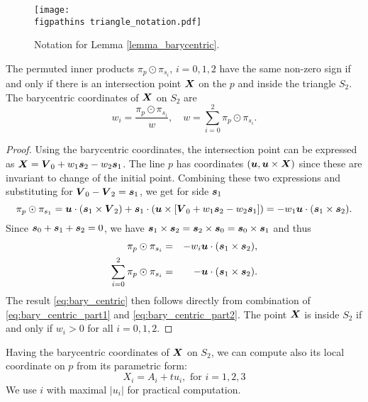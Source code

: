 \begin{figure}[!htb]
    \centering
    \texttt{[image: \\figpathins triangle\_notation.pdf]}
    \caption{Notation for Lemma \ref{lemma_barycentric}.}
    \label{fig:triangle_notation}
\end{figure}

\begin{lemma}
\label{lemma_barycentric}
The permuted inner products $\pi_p \odot \pi_{s_i},\, i=0,1,2$ have the same non-zero sign if and only if there
is an intersection point $\mathbf{\boldsymbol{X}}$ on the $p$ and inside the triangle $S_2$. 
The barycentric coordinates of $\mathbf{\boldsymbol{X}}$ on $S_2$ are
\begin{equation}
  \label{eq:bary_centric}
   w_i = \frac{\pi_p \odot \pi_{s_i}}{w},\quad w=\sum_{i=0}^{2} \pi_p \odot \pi_{s_i}.
\end{equation}
\end{lemma}
\begin{proof}
Using the barycentric coordinates, the intersection point can be expressed as $\mathbf{\boldsymbol{X}} = \mathbf{\boldsymbol{V}}_0 + w_1 \mathbf{\boldsymbol{s}}_2 - w_2 \mathbf{\boldsymbol{s}}_1$.
The line $p$ has \plucker coordinates $(\mathbf{\boldsymbol{u}}, \mathbf{\boldsymbol{u}} \times \mathbf{\boldsymbol{X}})$ since these are invariant to change of the initial point. 
Combining these two expressions and substituting for $\mathbf{\boldsymbol{V}}_0-\mathbf{\boldsymbol{V}}_2=\mathbf{\boldsymbol{s}}_1$, we get for side $\mathbf{\boldsymbol{s}}_1$
\[
   \pi_p \odot \pi_{s_1} = \mathbf{\boldsymbol{u}} \cdot (\mathbf{\boldsymbol{s}}_1 \times \mathbf{\boldsymbol{V}}_2) + \mathbf{\boldsymbol{s}}_1 \cdot ( \mathbf{\boldsymbol{u}} \times [\mathbf{\boldsymbol{V}}_0 + w_1\mathbf{\boldsymbol{s}}_2 - w_2 \mathbf{\boldsymbol{s}}_1])
   =-w_1 \mathbf{\boldsymbol{u}} \cdot (\mathbf{\boldsymbol{s}}_1 \times \mathbf{\boldsymbol{s}}_2).
\]
Since $\mathbf{\boldsymbol{s}}_0 + \mathbf{\boldsymbol{s}}_1 + \mathbf{\boldsymbol{s}}_2=0$, we have $ \mathbf{\boldsymbol{s}}_1 \times \mathbf{\boldsymbol{s}}_2 = \mathbf{\boldsymbol{s}}_2 \times \mathbf{\boldsymbol{s}}_0 = \mathbf{\boldsymbol{s}}_0 \times \mathbf{\boldsymbol{s}}_1$ and thus
\begin{eqnarray}
   \pi_p \odot \pi_{s_i} &=& -w_i \mathbf{\boldsymbol{u}} \cdot (\mathbf{\boldsymbol{s}}_1 \times \mathbf{\boldsymbol{s}}_2), \label{eq:bary_centric_part1}\\
   \sum_{i=0}^{2} \pi_p \odot \pi_{s_i} &=& - \mathbf{\boldsymbol{u}} \cdot (\mathbf{\boldsymbol{s}}_1 \times \mathbf{\boldsymbol{s}}_2). \label{eq:bary_centric_part2}
\end{eqnarray}
The result \eqref{eq:bary_centric} then follows directly from combination of \eqref{eq:bary_centric_part1} and \eqref{eq:bary_centric_part2}.
The point $\mathbf{\boldsymbol{X}}$ is inside $S_2$ if and only if $w_i>0$ for all $i=0,1,2$.
\end{proof}
Having the barycentric coordinates of $\mathbf{\boldsymbol{X}}$ on $S_2$, we can compute also its local coordinate on $p$ from its parametric form:
\begin{equation}
   \label{eq:line}
   X_i  = A_i + t u_i, \text{ for } i=1,2,3
\end{equation}
We use $i$ with maximal $|u_i|$ for practical computation. 

